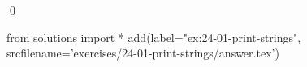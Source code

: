 
\begin{ex}
  \label{ex:24-01-print-strings}
  
  \qed
\end{ex}
\begin{python0}
from solutions import *
add(label="ex:24-01-print-strings",
    srcfilename='exercises/24-01-print-strings/answer.tex')
\end{python0}
